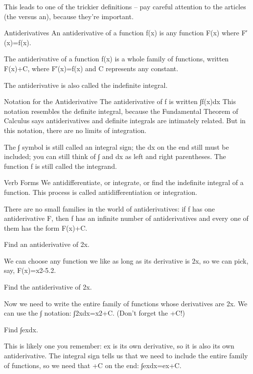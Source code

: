This leads to one of the trickier definitions – pay careful attention to the articles (the versus an), because they're important.

Antiderivatives
An antiderivative of a function f(x) is any function F(x) where F′(x)=f(x).

The antiderivative of a function f(x) is a whole family of functions, written F(x)+C, where F′(x)=f(x) and C represents any constant.

The antiderivative is also called the indefinite integral.

Notation for the Antiderivative
The antiderivative of f is written
∫f(x)dx
This notation resembles the definite integral, because the Fundamental Theorem of Calculus says antiderivatives and definite integrals are intimately related. But in this notation, there are no limits of integration.

The ∫ symbol is still called an integral sign; the dx on the end still must be included; you can still think of ∫ and dx as left and right parentheses. The function f is still called the integrand.

Verb Forms
We antidifferentiate, or integrate, or find the indefinite integral of a function. This process is called antidifferentiation or integration.

There are no small families in the world of antiderivatives: if f has one antiderivative F, then f has an infinite number of antiderivatives and every one of them has the form F(x)+C.

\begin{example}
Find an antiderivative of 2x.
\begin{solution}
We can choose any function we like as long as its derivative is 2x, so we can pick, say, F(x)=x2-5.2.
\end{solution}\end{example}

\begin{example}
Find the antiderivative of 2x.

\begin{solution}
  Now we need to write the entire family of functions whose derivatives are 2x. We can use the ∫ notation:
∫2xdx=x2+C.
(Don't forget the +C!)
\end{solution}\end{example}

\begin{example}
Find ∫exdx.

\begin{solution}
This is likely one you remember: ex is its own derivative, so it is also its own antiderivative. The integral sign tells us that we need to include the entire family of functions, so we need that +C on the end:
∫exdx=ex+C.
\end{solution}\end{example}

